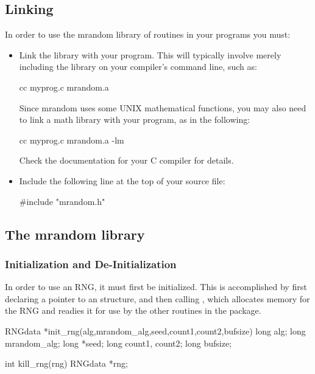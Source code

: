 \subsection{Linking}
In order to use the mrandom library of routines in your programs
you must:
\begin{itemize}
\item Link the  library with your program.  This will
typically involve merely including the library on your compiler's
command line, such as:\\
\begin{example}
cc myprog.c mrandom.a\\
\end{example}
Since mrandom uses some UNIX mathematical functions, you may also need
to link a math library with your program, as in the following:\\
\begin{example}
cc myprog.c mrandom.a -lm\\
\end{example}
Check the documentation for your C compiler for details.
\item Include the following line at the top of your source file:
\begin{example}
#include "mrandom.h"
\end{example}
\end{itemize}

\subsection{The mrandom library}
\label{sec:library}

\subsubsection{Initialization and De-Initialization}
\label{sec:initkill}

In order to use an RNG, it must first be initialized.  This
is accomplished by first declaring a pointer to an 
structure, and then calling , which allocates memory for
the RNG and readies it for use by the other routines in the
package.\\

\begin{example}
	RNGdata *init_rng(alg,mrandom_alg,seed,count1,count2,bufsize)
	long alg;
	long mrandom_alg;
	long *seed;
	long count1, count2;
	long bufsize;

	int kill_rng(rng)
	RNGdata *rng;\\
\end{example}

